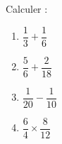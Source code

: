 
\begin{exercice}\label{exo2smath-0001}

    Calculer :
    \begin{enumerate}
        \item
            \( \dfrac{ 1 }{ 3 }+\dfrac{ 1 }{ 6 }\)
        \item
            \( \dfrac{ 5 }{ 6 }+\dfrac{ 2 }{ 18 }\)
        \item
            \( \dfrac{ 1 }{ 20 }-\dfrac{ 1 }{ 10 }\)
        \item
            \( \dfrac{ 6 }{ 4 }\times \dfrac{ 8 }{ 12 }\)
    \end{enumerate}

\end{exercice}
